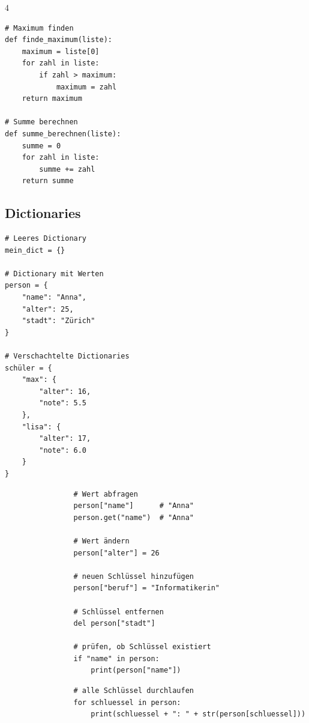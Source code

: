 \begin{landscape}
\begin{multicols*}{4}
		\begin{cheatSheetBox}[title=Algorithmen mit Listen]
			\begin{lstlisting}
# Maximum finden
def finde_maximum(liste):
    maximum = liste[0]
    for zahl in liste:
        if zahl > maximum:
            maximum = zahl
    return maximum

# Summe berechnen
def summe_berechnen(liste):
    summe = 0
    for zahl in liste:
        summe += zahl
    return summe
\end{lstlisting}
		\end{cheatSheetBox}

		\columnbreak\textcolor{\cheatSheetColor}{\subsection*{Dictionaries}}

		\begin{cheatSheetBox}[title=Dictionary erstellen]
			\begin{lstlisting}
# Leeres Dictionary
mein_dict = {}

# Dictionary mit Werten
person = {
    "name": "Anna",
    "alter": 25,
    "stadt": "Zürich"
}

# Verschachtelte Dictionaries
schüler = {
    "max": {
        "alter": 16,
        "note": 5.5
    },
    "lisa": {
        "alter": 17,
        "note": 6.0
    }
}
\end{lstlisting}
		\end{cheatSheetBox}

		\begin{cheatSheetBox}[title=Auf Dictionary zugreifen]
			\begin{lstlisting}
				# Wert abfragen
				person["name"]      # "Anna"
				person.get("name")  # "Anna"

				# Wert ändern
				person["alter"] = 26

				# neuen Schlüssel hinzufügen
				person["beruf"] = "Informatikerin"

				# Schlüssel entfernen
				del person["stadt"]

				# prüfen, ob Schlüssel existiert
				if "name" in person:
					print(person["name"])
			\end{lstlisting}
		\end{cheatSheetBox}

		\begin{cheatSheetBox}[title=Dictionary durchlaufen]
			\begin{lstlisting}
				# alle Schlüssel durchlaufen
				for schluessel in person:
					print(schluessel + ": " + str(person[schluessel]))


\end{lstlisting}
\end{cheatSheetBox}
\end{multicols*}
\end{landscape}
